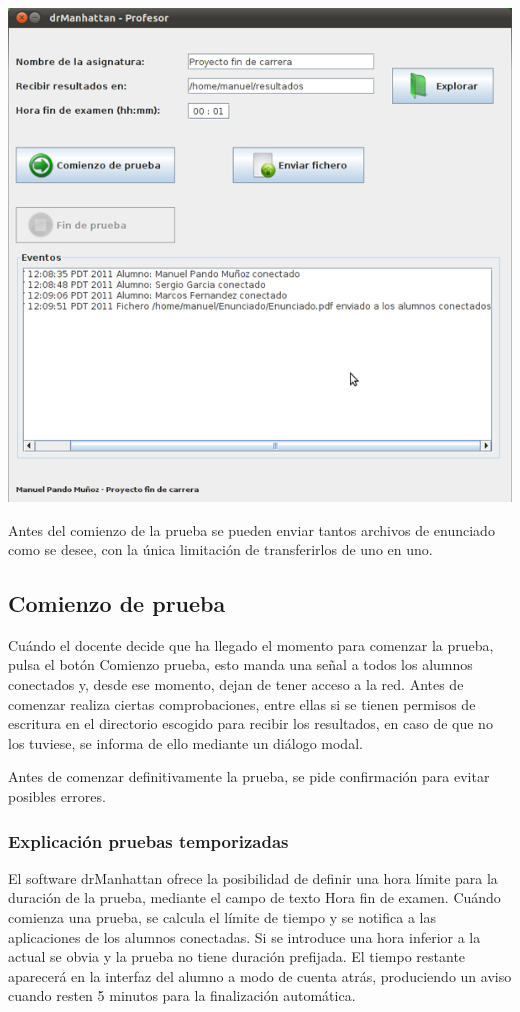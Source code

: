 \documentclass[a4paper,11pt]{article}
\begin{document}
\begin{center}
    \includegraphics[width=.90\linewidth]{imagenes/eventoEnviar}
\end{center}

Antes del comienzo de la prueba se pueden enviar tantos archivos de enunciado como se desee, con la única limitación de transferirlos de uno en uno.

\subsection{Comienzo de prueba}

Cuándo el docente decide que ha llegado el momento para comenzar la prueba, pulsa el botón Comienzo prueba, esto manda una señal a todos los alumnos conectados y, desde ese momento, dejan de tener acceso a la red.
Antes de comenzar realiza ciertas comprobaciones, entre ellas si se tienen permisos de escritura en el directorio escogido para recibir los resultados, en caso de que no los tuviese, se informa de ello mediante un diálogo modal.

Antes de comenzar definitivamente la prueba, se pide confirmación para evitar posibles errores.

\subsubsection{Explicación pruebas temporizadas}

El software drManhattan ofrece la posibilidad de definir una hora límite para la duración de la prueba, mediante el campo de texto Hora fin de examen. Cuándo comienza una prueba, se calcula el límite de tiempo y se notifica a las aplicaciones de los alumnos conectadas. Si se introduce una hora inferior a la actual se obvia y la prueba no tiene duración prefijada. El tiempo restante aparecerá en la interfaz del alumno a modo de cuenta atrás, produciendo un aviso cuando resten 5 minutos para la finalización automática.
\end{document}
